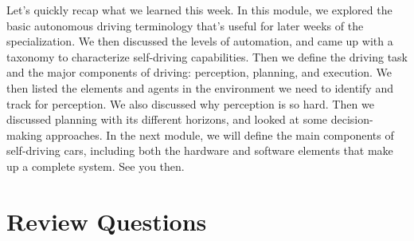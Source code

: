 Let's quickly recap what we learned this week. In this module, we explored the basic autonomous driving terminology that's useful for later weeks of the specialization. We then discussed the levels of automation, and came up with a taxonomy to characterize self-driving capabilities. Then we define the driving task and the major components of driving: perception, planning, and execution. We then listed the elements and agents in the environment we need to identify and track for perception. We also discussed why perception is so hard. Then we discussed planning with its different horizons, and looked at some decision-making approaches. In the next module, we will define the main components of self-driving cars, including both the hardware and software elements that make up a complete system. See you then.


\section{Review Questions}
\label{review_questions_chapter_1}



